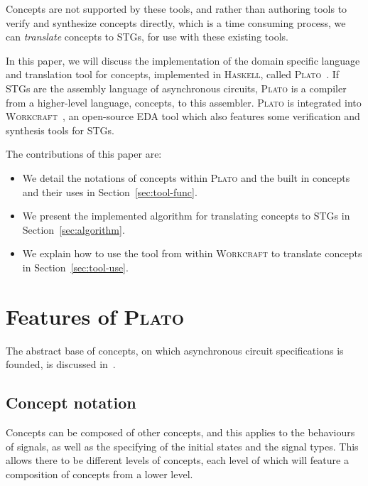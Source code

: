 \documentclass[british,conference,compsoc]{IEEEtran}
\newcommand{\noun}[1]{\textsc{#1}}
\begin{document}
Concepts are not supported by these tools, and rather than
authoring tools to verify and synthesize concepts directly, which is a time 
consuming process, we can \emph{translate} concepts to STGs, for use with these
existing tools.

In this paper, we will discuss the implementation of the domain specific 
language and translation tool for concepts, implemented in \noun{Haskell}, called 
\noun{Plato}~\cite{2016_concepts_github}.
If STGs are the assembly language of asynchronous circuits, \noun{Plato} is a 
compiler from a higher-level language, concepts, to this assembler. \noun{Plato} is 
integrated into \noun{Workcraft}~\cite{Workcraft_website}, an open-source 
EDA tool which also features some verification and synthesis tools for STGs.

The contributions of this paper are:
\vspace{-1mm}
\begin{itemize}
  \item We detail the notations of concepts within \noun{Plato} and the built in
  concepts and their uses in Section~\ref{sec:tool-func}.
  \item We present the implemented algorithm for translating concepts to STGs
  in Section~\ref{sec:algorithm}.
  \item We explain how to use the tool from within
  \noun{Workcraft} to translate concepts in Section~\ref{sec:tool-use}.
\end{itemize}

\section{Features of \noun{Plato}\label{sec:tool-func}}

\vspace{-3mm}

The abstract base of concepts, on which asynchronous circuit specifications 
is founded, is discussed in~\cite{2015_Beaumont_MEMOCODE}.

\vspace{-3mm}

\subsection{Concept notation \label{sub:concept-notation}}

\vspace{-3mm}

Concepts can be composed of other concepts, and this applies to the behaviours 
of signals, as well as the specifying of the initial states and the signal 
types. This allows there to be different levels of concepts, each level of 
which will feature a composition of concepts from a lower level. 
\end{document}
